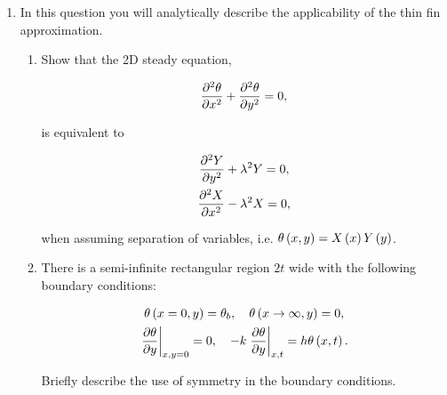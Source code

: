 \documentclass[12pt,letterpaper]{article}
\begin{document}
\begin{enumerate}
%
%
%	


\item In this question you will analytically describe the applicability of the thin fin approximation. 

	\begin{enumerate}
		\item Show that the 2D steady equation,
			
			\begin{equation*}
				\frac{\partial^2 \theta}{\partial x^2} + \frac{\partial^2 \theta}{\partial y^2} = 0,
			\end{equation*}
			
			is equivalent to
			
			\begin{gather*}
				\frac{\partial^2 Y}{\partial y^2} + \lambda^2 Y = 0, \\
				\frac{\partial^2 X}{\partial x^2} - \lambda^2 X = 0, \\
			\end{gather*}
			
			when assuming separation of variables, i.e. $\theta \left( x, y \right) = X \left( x \right) Y \left( y \right)$.
			
		\item There is a semi-infinite rectangular region $2t$ wide with the following boundary conditions:

			\begin{gather*}
				\theta \left( x = 0, y \right) = \theta_b, \quad \theta \left( x \to \infty, y \right) = 0, \\
				\left. \frac{\partial \theta}{\partial y} \right|_{x, y = 0} = 0, \quad -k \left. \frac{\partial \theta}{\partial y} \right|_{x, t} = h \theta \left( x, t \right).
			\end{gather*}
		
			Briefly describe the use of symmetry in the boundary conditions.
		

\end{enumerate}
\end{enumerate}
\end{document}
